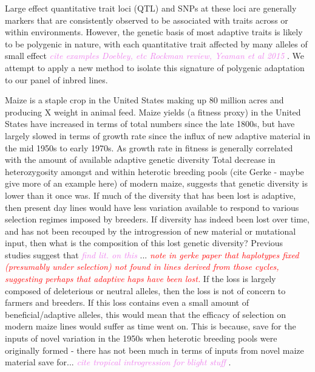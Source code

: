 \documentclass[9pt,twocolumn,twoside]{gsajnl}
\newcommand{\jri}[1]{\textcolor{red}{ \emph{ #1}} }
\newcommand{\kc}[1]{\textcolor{violet}{ \emph{ #1}} }
\begin{document}
Large effect quantitative trait loci (QTL) and SNPs at these loci are generally markers that are consistently observed to be associated with traits across or within environments. 
However, the genetic basis of most adaptive traits is likely to be polygenic in nature, with each quantitative trait affected by many alleles of small effect \kc{cite examples Doebley, etc Rockman review, Yeaman et al 2015}. We attempt to apply a new method to isolate this signature of polygenic adaptation to our panel of inbred lines.

Maize is a staple crop in the United States making up 80 million acres and producing X weight in animal feed. 
Maize yields (a fitness proxy) in the United States have increased in terms of total numbers since the late 1800s, but have largely slowed in terms of growth rate since the influx of new adaptive material in the mid 1950s to early 1970s. As growth rate in fitness is generally correlated with the amount of available adaptive genetic diversity 
Total decrease in heterozygosity amongst and within heterotic breeding pools (cite Gerke - maybe give more of an example here) of modern maize, suggests that genetic diversity is lower than it once was. 
If much of the diversity that has been lost is adaptive, then present day lines would have less variation available to respond to various selection regimes imposed by breeders. 
If diversity has indeed been lost over time, and has not been recouped by the introgression of new material or mutational input, then what is the composition of this lost genetic diversity? Previous studies suggest that \kc{find lit. on this}...
\jri{note in gerke paper that haplotypes fixed (presumably under selection) not found in lines derived from those cycles, suggesting perhaps that adaptive haps have been lost.}
If the loss is largely composed of deleterious or neutral alleles, then the loss is not of concern to farmers and breeders. 
If this loss contains even a small amount of beneficial/adaptive alleles, this would mean that the efficacy of selection on modern maize lines would suffer as time went on. 
This is because, save for the inputs of novel variation in the 1950s when heterotic breeding pools were originally formed - there has not been much in terms of inputs from novel maize material save for... \kc{cite tropical introgression for blight stuff}.
\end{document}
